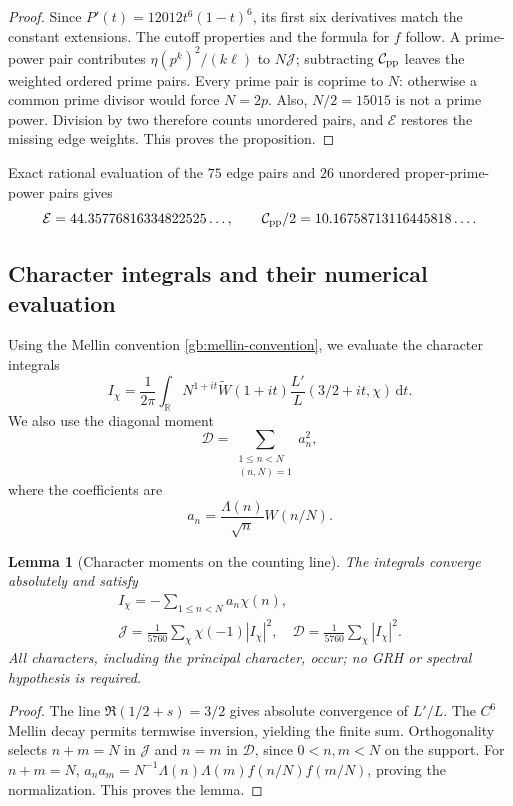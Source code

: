 \documentclass[12pt,a4paper]{amsart}
\numberwithin{equation}{section}
\def\le{\leqslant}
\theoremstyle{plain}
\newtheorem{lemma}[proposition]{Lemma}
\theoremstyle{definition}
\theoremstyle{remark}
\begin{document}
\begin{proof}
Since $P'(t)=12012t^6(1-t)^6$, its first six derivatives match the
constant extensions. The cutoff properties and the formula for $f$ follow.
A prime-power pair contributes $\eta(p^k)^2/(k\ell)$ to $N\mathcal J$;
subtracting $\mathcal C_{\rm pp}$ leaves the weighted ordered prime pairs.
Every prime pair is coprime to $N$: otherwise a common prime divisor
would force $N=2p$. Also, $N/2=15015$ is not a prime power.
Division by two therefore counts unordered pairs, and $\mathcal E$
restores the missing edge weights.
This proves the proposition.
\end{proof}

Exact rational evaluation of the $75$ edge pairs and $26$ unordered
proper-prime-power pairs gives
\[
 \mathcal E=44.35776816334822525\ldots,\qquad
 \mathcal C_{\rm pp}/2=10.16758713116445818\ldots.
\]

\subsection{Character integrals and their numerical evaluation}
\label{proof:app:num:method}

Using the Mellin convention \eqref{gb:mellin-convention}, we
evaluate the character integrals
\[
 I_\chi=\frac1{2\pi}\int_{\mathbb R}N^{1+it}\widetilde W(1+it)
       \frac{L'}L(3/2+it,\chi)\,\mathrm{d}t.
\]
We also use the diagonal moment
\[
 \mathcal D=\sum_{\substack{1\le n<N\\(n,N)=1}}a_n^2,
\]
where the coefficients are
\[
 a_n=\frac{\Lambda(n)}{\sqrt n}W(n/N).
\]

\begin{lemma}[Character moments on the counting line]
\label{proof:v9:wide-character-moments}
The integrals converge absolutely and satisfy
\begin{equation}\label{proof:app:num:moments}
 \begin{gathered}
 I_\chi=-\sum_{1\le n<N}a_n\chi(n),\\
 \mathcal J=\frac1{5760}\sum_\chi\chi(-1)|I_\chi|^2,\quad
 \mathcal D=\frac1{5760}\sum_\chi|I_\chi|^2.
 \end{gathered}
\end{equation}
All characters, including the principal character, occur; no GRH or
spectral hypothesis is required.
\end{lemma}

\begin{proof}
The line $\Re(1/2+s)=3/2$ gives absolute convergence of $L'/L$.
The $C^6$ Mellin decay permits termwise inversion, yielding the finite sum.
Orthogonality selects $n+m=N$ in $\mathcal J$ and $n=m$ in $\mathcal D$,
since $0<n,m<N$ on the support. For $n+m=N$,
$a_na_m=N^{-1}\Lambda(n)\Lambda(m)f(n/N)f(m/N)$, proving the normalization.
This proves the lemma.
\end{proof}
\end{document}

